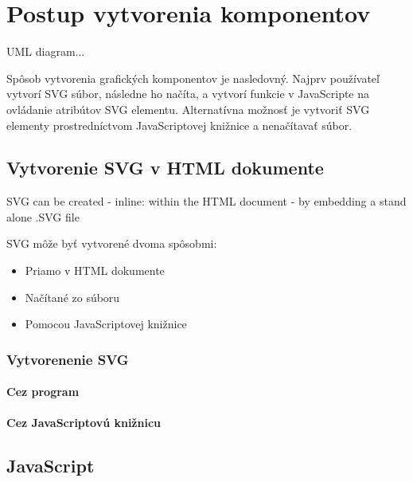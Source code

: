 \chapter{Postup vytvorenia komponentov}

UML diagram... 

Spôsob vytvorenia grafických komponentov je nasledovný. Najprv používateľ vytvorí SVG súbor, následne ho načíta, a vytvorí funkcie v JavaScripte na ovládanie atribútov SVG elementu. 
Alternatívna možnosť je vytvoriť SVG elementy prostredníctvom JavaScriptovej knižnice a nenačítavať súbor. 

\section{Vytvorenie SVG v HTML dokumente}

SVG can be created 
-   inline: within the HTML document 
-   by embedding a stand alone .SVG file

SVG môže byť vytvorené dvoma spôsobmi:
\begin{itemize}
	\item Priamo v HTML dokumente
	\item Načítané zo súboru
	\item Pomocou JavaScriptovej knižnice
\end{itemize}


 \subsection{Vytvorenenie SVG }
 
 \subsubsection{Cez program}
 
 \subsubsection{Cez JavaScriptovú knižnicu}



\section{JavaScript}